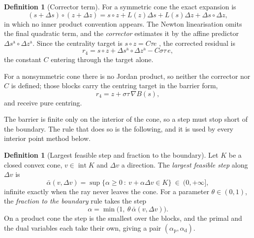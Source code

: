 \documentclass[a4paper,11pt]{book}
\theoremstyle{plain}
\theoremstyle{definition}
\newtheorem{definition}[theorem]{Definition}
\theoremstyle{remark}
\numberwithin{equation}{chapter}
\numberwithin{algorithm}{chapter}
\newcommand{\intr}{\operatorname{int}}
\begin{document}
	
	\begin{definition}[Corrector term]
		For a symmetric cone the exact expansion is
		\[
		(s+\Delta s)\circ(z+\Delta z)
		= s\circ z + L(z)\Delta s + L(s)\Delta z + \Delta s\circ\Delta z ,
		\]
		in which no inner product convention appears. The Newton linearisation omits
		the final quadratic term, and the \emph{corrector} estimates it by the affine
		predictor $\Delta s^{\mathrm a}\circ\Delta z^{\mathrm a}$. Since the centrality
		target is $s\circ z=C\tau e$ , the
		corrected residual is
		\begin{equation}
			r_4 = s\circ z + \Delta s^{\mathrm a}\circ\Delta z^{\mathrm a}
			- C\sigma\tau\,e ,
		\end{equation}
		the constant $C$ entering through the target alone.
		
		For a nonsymmetric cone there is no Jordan product, so neither the corrector nor
		$C$ is defined; those blocks carry the centring target in the barrier form,
		\begin{equation}
			r_4 = z + \sigma\tau\,\nabla B(s) ,
		\end{equation}
		and receive pure centring.
	\end{definition}
	
	The barrier is finite only on the interior of the cone, so a step must stop
	short of the boundary. The rule that does so is the following, and it is used
	by every interior point method below.

	\begin{definition}[Largest feasible step and fraction to the
		boundary]\label{def:fraction}
		Let $K$ be a closed convex cone, $v\in\intr K$ and $\Delta v$ a direction.
		The \emph{largest feasible step} along $\Delta v$ is
		\begin{equation}
			\bar\alpha(v,\Delta v)
			=\sup\bigl\{\alpha\geq0\ :\ v+\alpha\Delta v\in K\bigr\}
			\ \in\ (0,+\infty] ,
		\end{equation}
		infinite exactly when the ray never leaves the cone. For a parameter
		$\theta\in(0,1)$, the \emph{fraction to the boundary} rule takes the step
		\begin{equation}
			\alpha=\min\bigl(1,\ \theta\,\bar\alpha(v,\Delta v)\bigr) .
		\end{equation}
		On a product cone the step is the smallest over the blocks, and the primal
		and the dual variables each take their own, giving a pair
		$(\alpha_{\mathrm p},\alpha_{\mathrm d})$.
	\end{definition}
\end{document}
